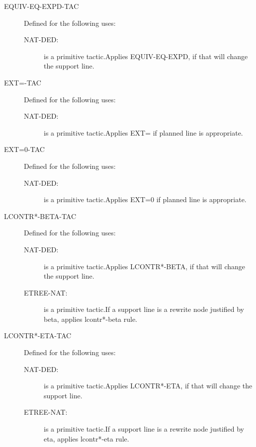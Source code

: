 \begin{description}
\begin{description}
\end{description}

\item[EQUIV-EQ-EXPD-TAC]  Defined for the following uses:
\begin{description}
\item[NAT-DED:]  is a primitive tactic.Applies EQUIV-EQ-EXPD, if that will change the support line.

\end{description}

\item[EXT=-TAC]  Defined for the following uses:
\begin{description}
\item[NAT-DED:]  is a primitive tactic.Applies EXT= if planned line is appropriate.

\end{description}

\item[EXT=0-TAC]  Defined for the following uses:
\begin{description}
\item[NAT-DED:]  is a primitive tactic.Applies EXT=0 if planned line is appropriate.

\end{description}

\item[LCONTR*-BETA-TAC]  Defined for the following uses:
\begin{description}
\item[NAT-DED:]  is a primitive tactic.Applies LCONTR*-BETA, if that will change the support line.

\item[ETREE-NAT:]  is a primitive tactic.If a support line is a rewrite node justified by beta, applies
lcontr*-beta rule.

\end{description}

\item[LCONTR*-ETA-TAC]  Defined for the following uses:
\begin{description}
\item[NAT-DED:]  is a primitive tactic.Applies LCONTR*-ETA, if that will change the support line.

\item[ETREE-NAT:]  is a primitive tactic.If a support line is a rewrite node justified by eta, applies
lcontr*-eta rule.


\end{description}
\end{description}
